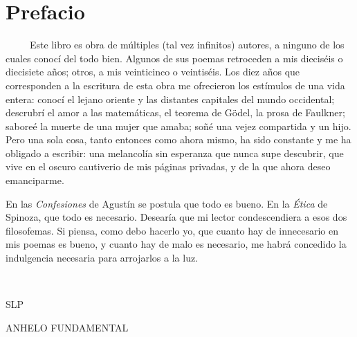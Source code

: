 \documentclass[a4paper, 12pt]{article}
\begin{document}
\section{Prefacio}

~ ~ ~ Este libro es obra de múltiples (tal vez infinitos) autores, a ninguno de
los cuales conocí del todo bien. Algunos de sus poemas retroceden a mis
dieciséis o diecisiete años; otros, a mis veinticinco o veintiséis. Los diez
años que corresponden a la escritura de esta obra me ofrecieron los estímulos
de una vida entera: conocí el lejano oriente y las distantes capitales del
mundo occidental; descrubrí el amor a las matemáticas, el teorema de Gödel, la
prosa de Faulkner; saboreé la muerte de una mujer que amaba; soñé una vejez compartida
y un hijo. Pero una sola cosa, tanto entonces como ahora mismo, ha sido
constante y me ha obligado a escribir: una melancolía sin esperanza que nunca
supe descubrir, que vive en el oscuro cautiverio de mis páginas privadas, y de
la que ahora deseo emanciparme.

En las \textit{Confesiones} de Agustín se postula que todo es bueno. En la
\textit{Ética} de Spinoza, que todo es necesario. Desearía que mi lector
condescendiera a esos dos filosofemas. Si piensa, como debo hacerlo yo, que
cuanto hay de innecesario en mis poemas es bueno, y cuanto hay de malo es
necesario, me habrá concedido la indulgencia necesaria para arrojarlos a la luz.

~ 


\hspace*{\fill}SLP
~

\pagebreak

\centerline{ANHELO FUNDAMENTAL}
~
\end{document}
